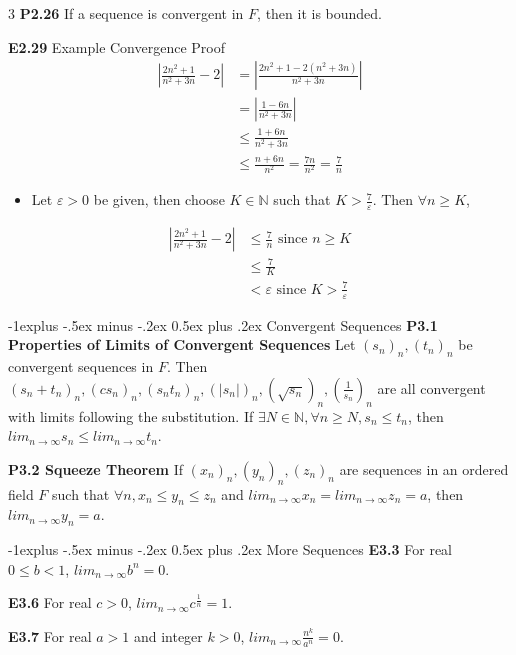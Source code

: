 \documentclass[10pt, landscape]{article}
\makeatletter
\renewcommand{\section}{\@startsection{section}{1}{0mm}%
                                {-1ex plus -.5ex minus -.2ex}%
                                {0.5ex plus .2ex}%
                                {\normalfont\large\bfseries}}
\renewcommand{\section}{\@startsection{section}{2}{0mm}%
                                {-1explus -.5ex minus -.2ex}%
                                {0.5ex plus .2ex}%
                                {\normalfont\normalsize\bfseries}}
\makeatother
\begin{document}
\begin{multicols*}{3}
\textbf{P2.26} If a sequence is convergent in $F$, then it is bounded.

\textbf{E2.29} Example Convergence Proof
\begin{align*} 
\left|\frac{2n^2+1}{n^2+3n}-2\right|&=\left|\frac{2n^2+1-2(n^2+3n)}{n^2+3n}\right|\\
&=\left|\frac{1-6n}{n^2+3n}\right|\\
&\leq \frac{1+6n}{n^2+3n}\\
&\leq \frac{n+6n}{n^2}=\frac{7n}{n^2}=\frac{7}{n}
\end{align*}
\begin{itemize}
    \item Let $\varepsilon > 0$ be given, then choose $K\in \mathbb{N}$ such that $K  > \frac{7}{\varepsilon}$. Then $\forall n \geq K$,
\end{itemize}
\begin{align*}
\left|\frac{2n^2+1}{n^2+3n}-2\right|&\leq \frac{7}{n} \text{ since $n \geq K$}\\
&\leq\frac{7}{K}\\
&<\varepsilon \text{ since $K > \frac{7}{\varepsilon}$}
\end{align*}

\section{Convergent Sequences}
\textbf{P3.1 Properties of Limits of Convergent Sequences} Let $(s_n)_n, (t_n)_n$ be convergent sequences in $F$. Then $(s_n+t_n)_n, (cs_n)_n, (s_nt_n)_n, (|s_n|)_n, (\sqrt{s_n})_n, (\frac{1}{s_n})_n$ are all convergent with limits following the substitution. If $\exists N \in \mathbb{N}, \forall n \geq N, s_n \leq t_n$, then $lim_{n\rightarrow\infty}s_n \leq lim_{n\rightarrow \infty}t_n$.

\textbf{P3.2 Squeeze Theorem} If $(x_n)_n, (y_n)_n, (z_n)_n$ are sequences in an ordered field $F$ such that $\forall n, x_n \leq y_n \leq z_n$ and $lim_{n\rightarrow\infty}x_n=lim_{n\rightarrow\infty}z_n=a$, then $lim_{n\rightarrow\infty}y_n=a$.

\section{More Sequences}
\textbf{E3.3} For real $0 \leq b < 1$, $lim_{n\rightarrow\infty}b^n=0$.

\textbf{E3.6} For real $c > 0$, $lim_{n\rightarrow\infty}c^{\frac{1}{n}}=1$.

\textbf{E3.7} For real $a>1$ and integer $k>0$, $lim_{n\rightarrow\infty}\frac{n^k}{a^n}=0$.


\end{multicols*}
\end{document}
